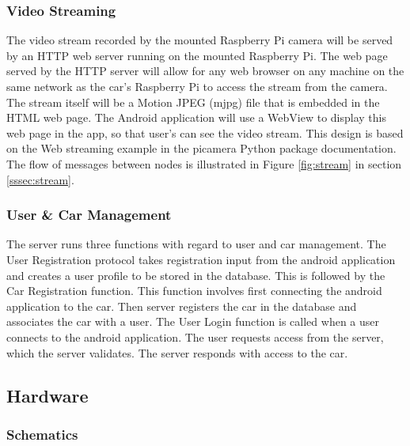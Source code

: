 \documentclass[letterpaper,12pt]{report}
\begin{document}
    \subsubsection{Video Streaming}

    The video stream recorded by the mounted Raspberry Pi camera will be served
    by an HTTP web server running on the mounted Raspberry Pi. The web page
    served by the HTTP server will allow for any web browser on any machine on
    the same network as the car’s Raspberry Pi to access the stream from the
    camera. The stream itself will be a Motion JPEG (mjpg) file that is embedded
    in the HTML web page. The Android application will use a WebView
    \cite{webbased} to display this web page in the app, so that user’s can see
    the video stream. This design is based on the Web streaming example
    \cite{advancedrecipes} in the picamera Python package documentation. The
    flow of messages between nodes is illustrated in Figure \ref{fig:stream} in
    section \ref{sssec:stream}.

    \subsubsection{User \& Car Management}

    The server runs three functions with regard to user and car management. The
    User Registration protocol takes registration input from the android
    application and creates a user profile to be stored in the database. This is
    followed by the Car Registration function. This function involves first
    connecting the android application to the car. Then server registers the car
    in the database and associates the car with a user. The User Login function
    is called when a user connects to the android application. The user requests
    access from the server, which the server validates. The server responds with
    access to the car.

    \subsection{Hardware}

    \subsubsection{Schematics}
\end{document}
